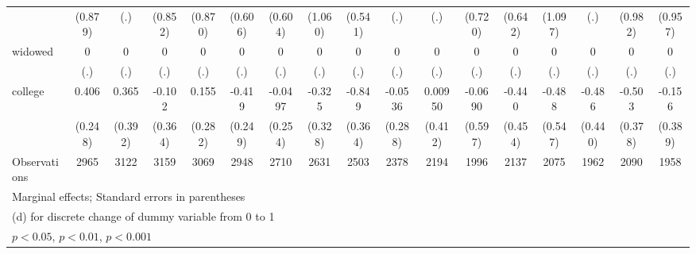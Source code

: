 {\begin{tabular}{l*{16}{c}}
                    &     (0.879)         &         (.)         &     (0.852)         &     (0.870)         &     (0.606)         &     (0.604)         &     (1.060)         &     (0.541)         &         (.)         &         (.)         &     (0.720)         &     (0.642)         &     (1.097)         &         (.)         &     (0.982)         &     (0.957)         \\
[1em]
widowed             &           0         &           0         &           0         &           0         &           0         &           0         &           0         &           0         &           0         &           0         &           0         &           0         &           0         &           0         &           0         &           0         \\
                    &         (.)         &         (.)         &         (.)         &         (.)         &         (.)         &         (.)         &         (.)         &         (.)         &         (.)         &         (.)         &         (.)         &         (.)         &         (.)         &         (.)         &         (.)         &         (.)         \\
[1em]
college             &       0.406         &       0.365         &      -0.102         &       0.155         &      -0.419         &     -0.0497         &      -0.325         &      -0.849\sym{*}  &     -0.0536         &     0.00950         &     -0.0690         &      -0.440         &      -0.488         &      -0.486         &      -0.503         &      -0.156         \\
                    &     (0.248)         &     (0.392)         &     (0.364)         &     (0.282)         &     (0.249)         &     (0.254)         &     (0.328)         &     (0.364)         &     (0.288)         &     (0.412)         &     (0.597)         &     (0.454)         &     (0.547)         &     (0.440)         &     (0.378)         &     (0.389)         \\
\hline
Observations        &        2965         &        3122         &        3159         &        3069         &        2948         &        2710         &        2631         &        2503         &        2378         &        2194         &        1996         &        2137         &        2075         &        1962         &        2090         &        1958         \\
\hline\hline
\multicolumn{17}{l}{\footnotesize Marginal effects; Standard errors in parentheses}\\
\multicolumn{17}{l}{\footnotesize  (d) for discrete change of dummy variable from 0 to 1}\\
\multicolumn{17}{l}{\footnotesize \sym{*} \(p<0.05\), \sym{**} \(p<0.01\), \sym{***} \(p<0.001\)}\\
\end{tabular}
}
